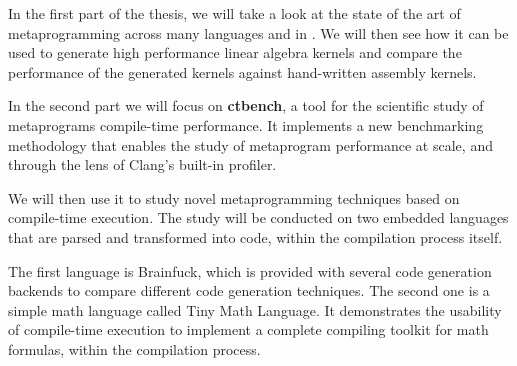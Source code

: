 \documentclass[main]{subfiles}
\begin{document}
In the first part of the thesis, we will take a look at the state of the art of
metaprogramming across many languages and in \cpp.
We will then see how it can be used to generate high performance linear algebra
kernels and compare the performance of the generated kernels against
hand-written assembly kernels.

In the second part we will focus on \textbf{ctbench}, a tool for the scientific
study of \cpp metaprograms compile-time performance. It implements a new
benchmarking methodology that enables the study of metaprogram performance
at scale, and through the lens of Clang's built-in profiler.

We will then use it to study novel \cpp metaprogramming techniques based on
compile-time \cpp execution. The study will be conducted on two embedded
languages that are parsed and transformed into \cpp code, within the \cpp
compilation process itself.

The first language is Brainfuck, which is provided with several code generation
backends to compare different code generation techniques. The second one
is a simple math language called Tiny Math Language. It demonstrates
the usability of compile-time \cpp execution to implement a complete compiling
toolkit for math formulas, within the \cpp compilation process.
\end{document}

